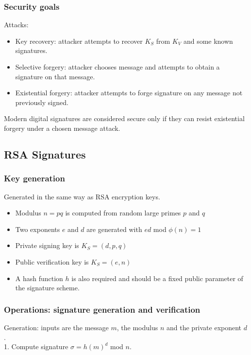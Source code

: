 \documentclass{article}
\begin{document}
\subsubsection{Security goals}

Attacks:
\begin{itemize}
    \item Key recovery: attacker attempts to recover $K_S$ from $K_V$ and some known signatures.
    \item Selective forgery: attacker chooses message and attempts to obtain a signature on that message.
    \item Existential forgery: attacker attempts to forge signature on any message not previously signed.
\end{itemize}
Modern digital signatures are considered secure only if they can resist existential forgery under a chosen message attack.

\subsection{RSA Signatures}

\subsubsection{Key generation}

Generated in the same way as RSA encryption keys.
\begin{itemize}
    \item Modulus $n=pq$ is computed from random large primes $p$ and $q$
    \item Two exponents $e$ and $d$ are generated with $ed$ mod $\phi(n) = 1$
    \item Private signing key is $K_S = (d,p,q)$
    \item Public verification key is $K_S = (e,n)$
    \item A hash function $h$ is also required and should be a fixed public parameter of the signature scheme.
\end{itemize}

\subsubsection{Operations: signature generation and verification}

Generation: inputs are the message $m$, the modulus $n$ and the private exponent $d$.\\
1. Compute signature $\sigma = h(m)^d$ mod $n$.
\end{document}
